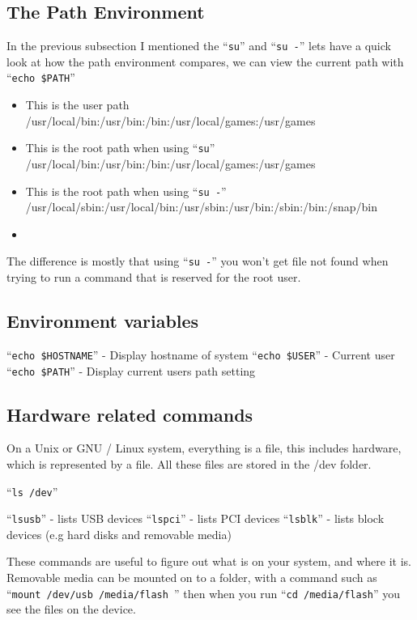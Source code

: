 \documentclass{book}
\begin{document}
\subsection{The Path Environment}
 In the previous subsection I mentioned the ``\verb|su|'' and ``\verb|su -|'' lets have a quick look at how the path environment compares, we can view the current path with ``\verb|echo $PATH|''
\begin{itemize}
\item This is the user path /usr/local/bin:/usr/bin:/bin:/usr/local/games:/usr/games
\item This is the root path when using ``\verb|su|'' /usr/local/bin:/usr/bin:/bin:/usr/local/games:/usr/games
\item This is the root path when using ``\verb|su -|'' /usr/local/sbin:/usr/local/bin:/usr/sbin:/usr/bin:/sbin:/bin:/snap/bin
\item
\end{itemize}

The difference is mostly that using ``\verb|su -|'' you won't get file not found when trying to run a command that is reserved for the root user.

\subsection{Environment variables}

``\verb|echo $HOSTNAME|'' - Display hostname of system
``\verb|echo $USER|'' - Current user
``\verb|echo $PATH|'' - Display current users path setting

\subsection{Hardware related commands}

On a Unix or GNU / Linux system, everything is a file, this includes hardware, which is represented by a file. All these files are stored in the /dev folder.

``\verb|ls /dev|''

``\verb|lsusb|'' - lists USB devices
``\verb|lspci|'' - lists PCI devices
``\verb|lsblk|'' - lists block devices (e.g hard disks and removable media)

These commands are useful to figure out what is on your system, and where it is. Removable media can be mounted on to a folder, with a command such as ``\verb|mount /dev/usb /media/flash |''  then when you run ``\verb|cd /media/flash|'' you see the files on the device.
\end{document}
